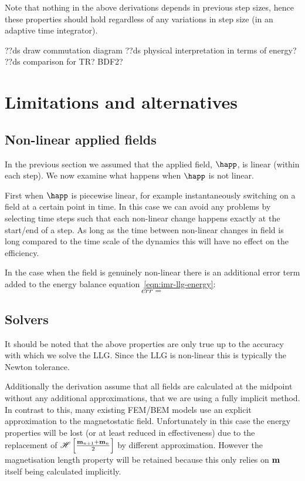 Note that nothing in the above derivations depends in previous step sizes, hence these properties should hold regardless of any variations in step size (\ie in an adaptive time integrator).

??ds draw commutation diagram
??ds physical interpretation in terms of energy?
??ds comparison for TR? BDF2?


\section{Limitations and alternatives}

\subsection{Non-linear applied fields}
\label{sec:non-linear-applied}

In the previous section we assumed that the applied field, $\happ$, is linear (within each step).
We now examine what happens when $\happ$ is not linear.

First when $\happ$ is piecewise linear, for example instantaneously switching on a field at a certain point in time.
In this case we can avoid any problems by selecting time steps such that each non-linear change happens exactly at the start/end of a step.
As long as the time between non-linear changes in field is long compared to the time scale of the dynamics this will have no effect on the efficiency.

In the case when the field is genuinely non-linear there is an additional error term added to the energy balance equation~\eqref{eqn:imr-llg-energy}:
\begin{equation}
  err =
\end{equation}


\subsection{Solvers}

It should be noted that the above properties are only true up to the accuracy with which we solve the LLG. Since the LLG is non-linear this is typically the Newton tolerance.

Additionally the derivation assume that all fields are calculated at the midpoint without any additional approximations, \ie that we are using a fully implicit method.
In contrast to this, many existing FEM/BEM models use an explicit approximation to the magnetostatic field.
Unfortunately in this case the energy properties will be lost (or at least reduced in effectiveness) due to the replacement of $\mathscr{H} \left[ \frac{\mathbf{m}_{n+1} + \mathbf{m}_n}{2} \right]$ by different approximation.
However the magnetisation length property will be retained because this only relies on $\mathbf{m}$ itself being calculated implicitly.

